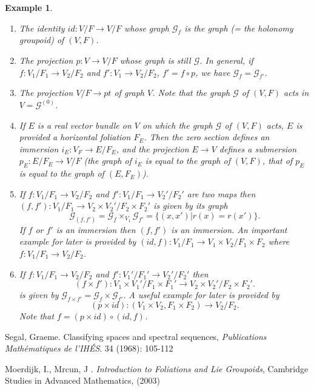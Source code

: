 \documentclass[12pt]{amsart}
\newtheorem{example}[thm]{Example}
\theoremstyle{definition}
\theoremstyle{remark}
\numberwithin{equation}{section}
\newcommand{\CG}{{\mathcal G}}
\begin{document}
\begin{example}
\begin{enumerate}
    \item The identity $id: V/F \to V/F$ whose graph $\CG_f$ is the graph (= the holonomy groupoid) of $(V, F)$.
    \item The projection $p: V\to V/F$ whose graph is still $\CG$. In general, if $f: V_1/F_1 \to V_2/F_2$ and $f': V_1 \to V_2/F_2$, $f' = f \circ p$, we have $\CG_f = \CG_{f'}$.
    \item The projection $V/F \to pt$ of graph $V$. Note that the graph $\CG$ of $(V, F)$ acts in $V = \CG^{(0)}$.
    \item If $E$ is a real vector bundle on $V$ on which the graph $\CG$ of $(V,F)$ acts, $E$ is provided a horizontal foliation $F_E$. Then the zero section defines an immersion $i_E: V_F \to E/F_E$, and the projection $E \to V$ defines a submersion $p_E: E/F_E \to V/F$ (the graph of $i_E$ is equal to the graph of $(V, F)$, that of $p_E$ is equal to the graph of $(E, F_E)$).
    \item If $f:V_1/F_1 \to V_2/F_2$ and $f':V_1/F_1 \to V_2'/F_2'$ are two maps then $(f, f'): V_1/F_1 \to V_2 \times V_2'/F_2 \times F_2'$ is given by its graph
    $$
    \CG_{(f,f')} = \CG_{f} \times_{V_1} \CG_{f'} =\{(x,x')| r(x) = r(x')\}.  
    $$
    If $f$ or $f'$ is an immersion then $(f, f')$ is an immersion. An important example for later is provided by $(id, f): V_1/F_1 \to V_1 \times V_2/ F_1 \times F_2 $ where $f:V_1/F_1 \to V_2/F_2$.
    
    \item If $f:V_1/F_1 \to V_2/F_2$ and $f':V_1'/F_1' \to V_2'/F_2'$ then 
    $$(f\times f'): V_1\times V_1'/F_1\times F_1' \to V_2 \times V_2'/F_2 \times F_2'.$$ is given by
    $\CG_{f \times f'} = \CG_f \times \CG_{f'}$. A useful example for later is provided by
    $$
    (p \times id): (V_1 \times V_2, F_1 \times F_2) \to V_2 / F_2.
    $$
    Note that $f = (p\times id) \circ (id, f)$.
\end{enumerate}
\end{example}



\begin{thebibliography}{10}

	 Segal, Graeme. Classifying spaces and spectral sequences, \textit{Publications Mathématiques de l'IHÉS}. 34 (1968): 105-112
	
	 Moerdijk, I.,  Mrcun, J .  \textit{Introduction to Foliations and Lie Groupoids},
Cambridge Studies in Advanced Mathematics, (2003)
	
	
\end{thebibliography}
\end{document}
